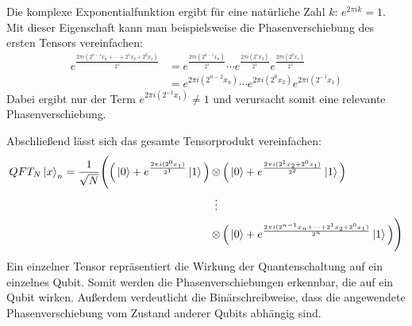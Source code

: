 Die komplexe Exponentialfunktion ergibt für eine natürliche Zahl \(k\): \(e^{2\pi i k} = 1\).
Mit dieser Eigenschaft kann man beispielsweise die Phasenverschiebung des ersten Tensors vereinfachen:
\begin{align*} 
  e^{\frac{2 \pi i (2^{n-1}x_n+ \dotsb +2^1x_2+2^0x_1)}{2^1}}
  &=
  e^{\frac{2 \pi i (2^{n-1}x_n)}{2^1}} \dotsb e^{\frac{2 \pi i (2^1x_2)}{2^1}} e^{\frac{2 \pi i (2^0x_1)}{2^1}} \\
  &=
  e^{{2 \pi i (2^{n-2}x_n)}} \dotsb e^{{2 \pi i (2^0x_2)}} e^{{2 \pi i (2^{-1}x_1)}}
\end{align*}
Dabei ergibt nur der Term \(e^{{2 \pi i (2^{-1}x_1)}} \neq 1 \)  
und verursacht somit eine relevante Phasenverschiebung.

Abschließend lässt sich das gesamte Tensorprodukt vereinfachen:
\begin{align*}
  QFT_{N}\ket{x}_{n} = 
  \frac{1}{\sqrt{N}}
  \Bigg(
    \Big(\ket{0} + { e^{\frac{2 \pi i (2^0x_1)}{2^1}}}\ket{1}\Big) 
    &\tensor
    \Big( \ket{0} + { e^{\frac{2 \pi i (2^1x_2+2^0x_1)}{2^2}}}\ket{1}\Big) \\
    &\vdotswithin{\tensor}\\
    &\tensor
    \Big( \ket{0} + { e^{\frac{2 \pi i (2^{n-1}x_n+ \dotsb +2^1x_2+2^0x_1)}{2^n}}}\ket{1}\Big)
  \Bigg)
\end{align*}
Ein einzelner Tensor repräsentiert die Wirkung der Quantenschaltung auf ein einzelnes Qubit. 
Somit werden die Phasenverschiebungen erkennbar, 
die auf ein Qubit wirken. 
Außerdem verdeutlicht die Binärschreibweise, 
dass die angewendete Phasenverschiebung vom Zustand anderer Qubits abhängig sind.

